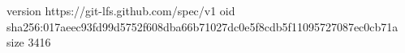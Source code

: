 version https://git-lfs.github.com/spec/v1
oid sha256:017aeec93fd99d5752f608dba66b71027dc0e5f8cdb5f11095727087ec0cb71a
size 3416
